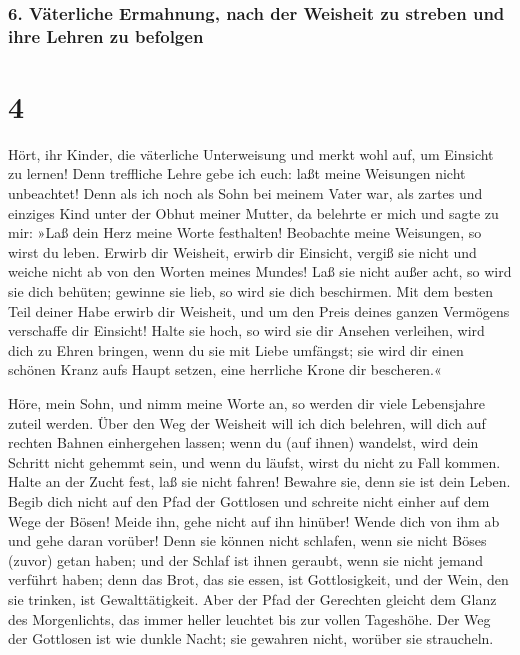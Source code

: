 \hypertarget{vuxe4terliche-ermahnung-nach-der-weisheit-zu-streben-und-ihre-lehren-zu-befolgen}{%
\subsubsection{6. Väterliche Ermahnung, nach der Weisheit zu streben und
ihre Lehren zu
befolgen}\label{vuxe4terliche-ermahnung-nach-der-weisheit-zu-streben-und-ihre-lehren-zu-befolgen}}

\hypertarget{section-3}{%
\section{4}\label{section-3}}

Hört, ihr Kinder, die väterliche Unterweisung und merkt
wohl auf, um Einsicht zu lernen! Denn treffliche Lehre
gebe ich euch: laßt meine Weisungen nicht unbeachtet! Denn
als ich noch als Sohn bei meinem Vater war, als zartes und einziges Kind
unter der Obhut meiner Mutter, da belehrte er mich und
sagte zu mir: »Laß dein Herz meine Worte festhalten! Beobachte meine
Weisungen, so wirst du leben. Erwirb dir Weisheit, erwirb
dir Einsicht, vergiß sie nicht und weiche nicht ab von den Worten meines
Mundes! Laß sie nicht außer acht, so wird sie dich
behüten; gewinne sie lieb, so wird sie dich beschirmen.
Mit dem besten Teil deiner Habe erwirb dir Weisheit, und
um den Preis deines ganzen Vermögens verschaffe dir Einsicht!
Halte sie hoch, so wird sie dir Ansehen verleihen, wird
dich zu Ehren bringen, wenn du sie mit Liebe umfängst; sie
wird dir einen schönen Kranz aufs Haupt setzen, eine herrliche Krone dir
bescheren.«

Höre, mein Sohn, und nimm meine Worte an, so werden dir
viele Lebensjahre zuteil werden. Über den Weg der
Weisheit will ich dich belehren, will dich auf rechten Bahnen
einhergehen lassen; wenn du (auf ihnen) wandelst, wird
dein Schritt nicht gehemmt sein, und wenn du läufst, wirst du nicht zu
Fall kommen. Halte an der Zucht fest, laß sie nicht
fahren! Bewahre sie, denn sie ist dein Leben. Begib dich
nicht auf den Pfad der Gottlosen und schreite nicht einher auf dem Wege
der Bösen! Meide ihn, gehe nicht auf ihn hinüber! Wende
dich von ihm ab und gehe daran vorüber! Denn sie können
nicht schlafen, wenn sie nicht Böses (zuvor) getan haben; und der Schlaf
ist ihnen geraubt, wenn sie nicht jemand verführt haben;
denn das Brot, das sie essen, ist Gottlosigkeit, und der
Wein, den sie trinken, ist Gewalttätigkeit. Aber der Pfad
der Gerechten gleicht dem Glanz des Morgenlichts, das immer heller
leuchtet bis zur vollen Tageshöhe. Der Weg der Gottlosen
ist wie dunkle Nacht; sie gewahren nicht, worüber sie straucheln.

